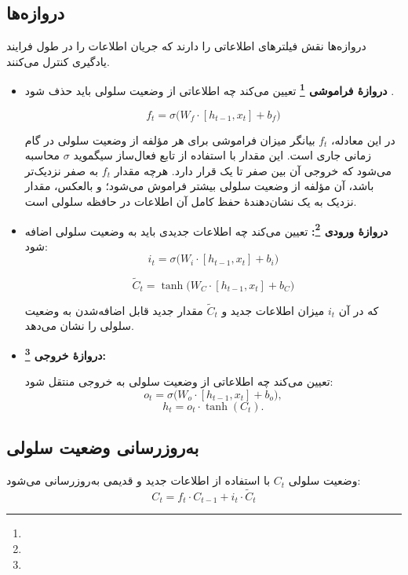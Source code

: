 \subsection{دروازه‌ها}
دروازه‌ها نقش فیلترهای اطلاعاتی را دارند که جریان اطلاعات را در طول فرایند یادگیری کنترل می‌کنند.

\begin{itemize}
	\item \textbf{دروازهٔ فراموشی \footnote{}}
	تعیین می‌کند چه اطلاعاتی از وضعیت سلولی باید حذف شود
	\cite{gers1999learning}.
	
	\begin{equation}
		f_t = \sigma \big( W_f \cdot [h_{t-1}, x_t] + b_f \big)
	\end{equation}

در این معادله، \( f_t \) بیانگر میزان فراموشی برای هر مؤلفه از وضعیت سلولی در گام زمانی جاری است. این مقدار با استفاده از تابع فعال‌ساز سیگموید \( \sigma \) محاسبه می‌شود که خروجی آن بین صفر تا یک قرار دارد. هرچه مقدار \( f_t \) به صفر نزدیک‌تر باشد، آن مؤلفه از وضعیت سلولی بیشتر فراموش می‌شود؛ و بالعکس، مقدار نزدیک به یک نشان‌دهندهٔ حفظ کامل آن اطلاعات در حافظه سلولی است.



	\item \textbf{دروازهٔ ورودی \footnote{}:}
	تعیین می‌کند چه اطلاعات جدیدی باید به وضعیت سلولی اضافه شود:
	\begin{equation}
		i_t = \sigma \big( W_i \cdot [h_{t-1}, x_t] + b_i \big)
	\end{equation}
	
	\begin{equation}
		\tilde{C}_t = \tanh \big( W_C \cdot [h_{t-1}, x_t] + b_C \big)
	\end{equation}

	که در آن \( i_t \) میزان اطلاعات جدید و \( \tilde{C}_t \) مقدار جدید قابل اضافه‌شدن به وضعیت سلولی را نشان می‌دهد.
	
\item \textbf{دروازهٔ خروجی \footnote{}:}

	تعیین می‌کند چه اطلاعاتی از وضعیت سلولی به خروجی منتقل شود:
	\[
	o_t = \sigma \big( W_o \cdot [h_{t-1}, x_t] + b_o \big),
	\]
	\[
	h_t = o_t \cdot \tanh(C_t).
	\]
\end{itemize}

\subsection{به‌روزرسانی وضعیت سلولی}
وضعیت سلولی \( C_t \) با استفاده از اطلاعات جدید و قدیمی به‌روزرسانی می‌شود:
	\begin{equation}
		C_t = f_t \cdot C_{t-1} + i_t \cdot \tilde{C}_t
	\end{equation}


